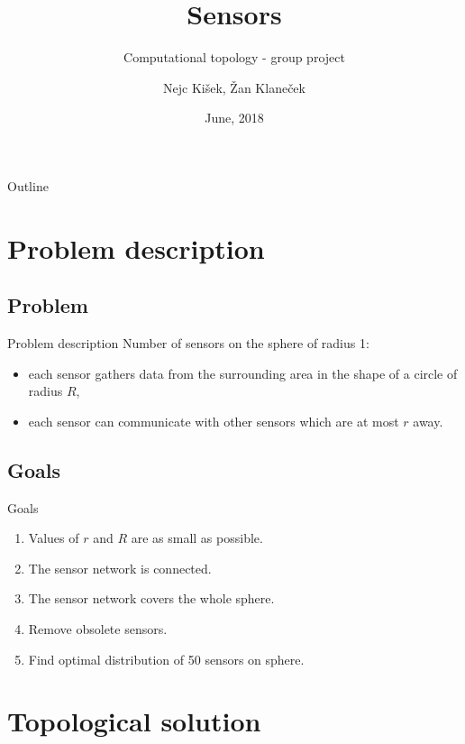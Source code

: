 \documentclass{beamer}
\title{Sensors}
\subtitle{Computational topology - group project}
\author[]{Nejc Kišek, Žan Klaneček}
\institute[] %
{

  Faculty of computer and information science\\
  University of Ljubljana}
\date{June, 2018}
\begin{document}
\begin{frame}
  \titlepage
\end{frame}

\begin{frame}{Outline}
  \tableofcontents
\end{frame}

\section{Problem description}
\subsection{Problem}

\begin{frame}{Problem description}{}
Number of sensors on the sphere of radius 1:

\begin{itemize}
	\item {
		each sensor gathers data from the surrounding area in the shape of a circle of radius
		$R$,
	}
	\item {
		each sensor can communicate with other sensors which are at most $r$ away.
	}
\end{itemize}
\end{frame}
\subsection{Goals}
\begin{frame}{Goals}{}

\begin{enumerate}
	\item {Values of $r$ and $R$ are as small as possible.}
	\item {The sensor network is connected.}
	\item {The sensor network covers the whole sphere.}
	\item {Remove obsolete sensors.}
	\item {Find optimal distribution of 50 sensors on sphere.}
\end{enumerate}

\end{frame}

\section{Topological solution}
\end{document}
